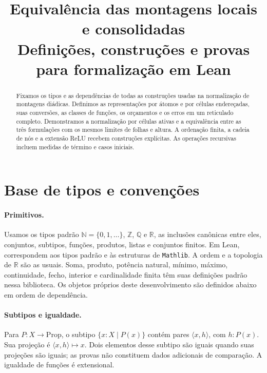 \documentclass[11pt,a4paper]{article}
\title{\textbf{Equivalência das montagens locais e consolidadas}\\[4pt]
\large Definições, construções e provas para formalização em Lean}
\author{}
\date{}
\newcommand{\N}{\mathbb N}
\newcommand{\Z}{\mathbb Z}
\newcommand{\Q}{\mathbb Q}
\newcommand{\R}{\mathbb R}
\newcommand{\code}[1]{\nolinkurl{#1}}
\begin{document}
\maketitle
\vspace{-9mm}
\begin{abstract}
Fixamos os tipos e as dependências de todas as construções usadas na
normalização de montagens diádicas. Definimos as representações por
átomos e por células endereçadas, suas conversões, as classes de funções,
os orçamentos e os erros em um reticulado completo. Demonstramos a
normalização por células ativas e a equivalência entre as três
formulações com os mesmos limites de folhas e altura. A ordenação finita,
a cadeia de nós e a extensão ReLU recebem construções explícitas. As
operações recursivas incluem medidas de término e casos iniciais.
\end{abstract}

\section{Base de tipos e convenções}
\label{sec:base}

\paragraph{Primitivos.}
Usamos os tipos padrão $\N=\{0,1,\ldots\}$, $\Z$, $\Q$ e $\R$,
as inclusões canônicas entre eles, conjuntos, subtipos, funções,
produtos, listas e conjuntos finitos. Em Lean, correspondem aos tipos
padrão e às estruturas de \code{Mathlib}. A ordem e a topologia de $\R$
são as usuais. Soma, produto, potência natural, mínimo, máximo,
continuidade, fecho, interior e cardinalidade finita têm suas definições
padrão nessa biblioteca. Os objetos próprios deste desenvolvimento são
definidos abaixo em ordem de dependência.

\paragraph{Subtipos e igualdade.}
Para $P:X\to\mathrm{Prop}$, o subtipo
$\{x:X\mid P(x)\}$ contém pares $\langle x,h\rangle$, com $h:P(x)$.
Sua projeção é $\langle x,h\rangle\mapsto x$. Dois elementos desse subtipo
são iguais quando suas projeções são iguais; as provas não constituem
dados adicionais de comparação. A igualdade de funções é extensional.
\end{document}
